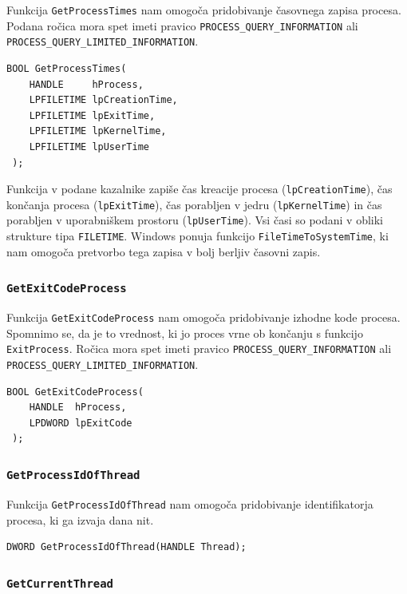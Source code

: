 \documentclass[a4paper,12pt,openright]{book}
\begin{document}
Funkcija \texttt{GetProcessTimes} nam omogoča pridobivanje časovnega zapisa procesa.
Podana ročica mora spet imeti pravico \texttt{PROCESS\_QUERY\_INFORMATION} ali \texttt{PROCESS\_QUERY\_LIMITED\_INFORMATION}.

\begin{lstlisting}[style=func]
 BOOL GetProcessTimes(
	HANDLE     hProcess,
	LPFILETIME lpCreationTime,
	LPFILETIME lpExitTime,
	LPFILETIME lpKernelTime,
	LPFILETIME lpUserTime
 );
\end{lstlisting}

Funkcija v podane kazalnike zapiše čas kreacije procesa (\texttt{lpCreationTime}), čas končanja procesa (\texttt{lpExitTime}), čas porabljen v jedru (\texttt{lpKernelTime}) in čas porabljen v uporabniškem prostoru (\texttt{lpUserTime}).
Vsi časi so podani v obliki strukture tipa \texttt{FILETIME}.
Windows ponuja funkcijo \texttt{FileTimeToSystemTime}, ki nam omogoča pretvorbo tega zapisa v bolj berljiv časovni zapis.

\subsubsection{\texttt{GetExitCodeProcess}}

Funkcija \texttt{GetExitCodeProcess} nam omogoča pridobivanje izhodne kode procesa.
Spomnimo se, da je to vrednost, ki jo proces vrne ob končanju s funkcijo \texttt{ExitProcess}.
Ročica mora spet imeti pravico \texttt{PROCESS\_QUERY\_INFORMATION} ali \texttt{PROCESS\_QUERY\_LIMITED\_INFORMATION}.

\begin{lstlisting}[style=func]
 BOOL GetExitCodeProcess(
	HANDLE  hProcess,
	LPDWORD lpExitCode
 );
\end{lstlisting}

\subsubsection{\texttt{GetProcessIdOfThread}}

Funkcija \texttt{GetProcessIdOfThread} nam omogoča pridobivanje identifikatorja procesa, ki ga izvaja dana nit.

\begin{lstlisting}[style=func]
 DWORD GetProcessIdOfThread(HANDLE Thread);
\end{lstlisting}

\subsubsection{\texttt{GetCurrentThread}}
\end{document}
